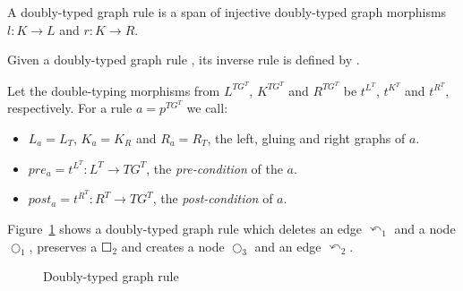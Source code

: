 \begin{definition} A doubly-typed graph rule \doublyTypedRule{} is a span of injective doubly-typed graph morphisms $l : K \rightarrow L$ and $r : K \rightarrow R$.


  Given a doubly-typed graph rule \doublyTypedRule{}, its inverse rule is defined by \inverseDoublyTypedRule{}.

  Let the double-typing morphisms from $L^{TG^T}$, $K^{TG^T}$ and $R^{TG^T}$ be $t^{L^T}$, $t^{K^T}$ and $t^{R^T}$, respectively. For a rule $a = p^{TG^T}$ we call:

  \begin{itemize}
    \item $L_a = L_T$, $K_a = K_R$ and $R_a = R_T$, the left, gluing and right graphs of $a$.
    \item $pre_a = t^{L^T} : L^T \rightarrow TG^T$, the \emph{pre-condition} of the $a$.
    \item $post_a = t^{R^T} : R^T \rightarrow TG^T$, the \emph{post-condition} of $a$.
  \end{itemize}

\end{definition}

\begin{example}Figure~\ref{fig:process:doubly-typed-graph-rule} shows a doubly-typed graph rule which deletes an edge $\curvearrowleft_1$ and a node $\Circle_1$, preserves a $\Square_2$ and creates a node $\Circle_3$ and an edge $\curvearrowleft_2$.

\begin{figure}[!ht]
  \centering
  \caption{Doubly-typed graph rule}\label{fig:process:doubly-typed-graph-rule}
\end{figure}
\end{example}

